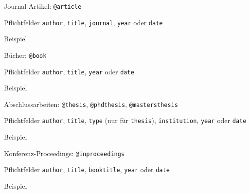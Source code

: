 \begin{frame}[fragile]{Journal-Artikel: \lstinline+@article+}
  \begin{block}{Pflichtfelder}
    \texttt{author},
    \texttt{title},
    \texttt{journal},
    \texttt{year} oder \texttt{date}
  \end{block}

  \begin{block}{Beispiel}
    
  \end{block}

\end{frame}

\begin{frame}[fragile]{Bücher: \lstinline+@book+}
  \begin{block}{Pflichtfelder}
    \texttt{author},
    \texttt{title},
    \texttt{year} oder \texttt{date}
  \end{block}

  \begin{block}{Beispiel}
    
  \end{block}

\end{frame}

\begin{frame}[fragile]{Abschlussarbeiten: \lstinline+@thesis+, \lstinline+@phdthesis+, \lstinline+@mastersthesis+}
  \begin{block}{Pflichtfelder}
    \texttt{author},
    \texttt{title},
    \texttt{type} (nur für \lstinline+thesis+),
    \texttt{institution},
    \texttt{year} oder \texttt{date}
  \end{block}

  \begin{block}{Beispiel}
    
  \end{block}
\end{frame}

\begin{frame}[fragile]{Konferenz-Proceedings: \lstinline+@inproceedings+}
  \begin{block}{Pflichtfelder}
    \texttt{author},
    \texttt{title},
    \texttt{booktitle},
    \texttt{year} oder \texttt{date}
  \end{block}

  \begin{block}{Beispiel}
    
  \end{block}
\end{frame}

